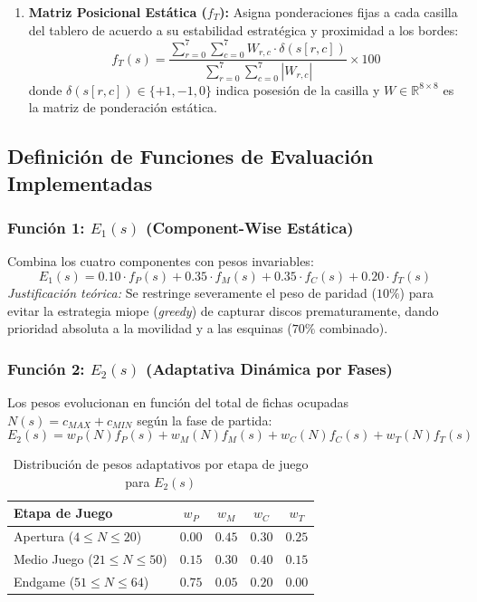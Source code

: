 \documentclass[10pt,a4paper]{article}
\begin{document}
\begin{enumerate}
    \item \textbf{Matriz Posicional Estática ($f_T$):} Asigna ponderaciones fijas a cada casilla del tablero de acuerdo a su estabilidad estratégica y proximidad a los bordes:
    \begin{equation}
        f_T(s) = \frac{\sum_{r=0}^{7} \sum_{c=0}^{7} W_{r,c} \cdot \delta(s[r,c])}{\sum_{r=0}^{7} \sum_{c=0}^{7} |W_{r,c}|} \times 100
    \end{equation}
    donde $\delta(s[r,c]) \in \{+1, -1, 0\}$ indica posesión de la casilla y $W \in \mathbb{R}^{8 \times 8}$ es la matriz de ponderación estática.
\end{enumerate}

\subsection{Definición de Funciones de Evaluación Implementadas}

\subsubsection{Función 1: \texorpdfstring{$E_1(s)$}{E1(s)} (Component-Wise Estática)}
Combina los cuatro componentes con pesos invariables:
\begin{equation}
    E_1(s) = 0.10 \cdot f_P(s) + 0.35 \cdot f_M(s) + 0.35 \cdot f_C(s) + 0.20 \cdot f_T(s)
\end{equation}
\textit{Justificación teórica:} Se restringe severamente el peso de paridad ($10\%$) para evitar la estrategia miope (\textit{greedy}) de capturar discos prematuramente, dando prioridad absoluta a la movilidad y a las esquinas ($70\%$ combinado).

\subsubsection{Función 2: \texorpdfstring{$E_2(s)$}{E2(s)} (Adaptativa Dinámica por Fases)}
Los pesos evolucionan en función del total de fichas ocupadas $N(s) = c_{MAX} + c_{MIN}$ según la fase de partida:
\begin{equation}
    E_2(s) = w_P(N) f_P(s) + w_M(N) f_M(s) + w_C(N) f_C(s) + w_T(N) f_T(s)
\end{equation}

\begin{table}[h]
    \centering
    \caption{Distribución de pesos adaptativos por etapa de juego para $E_2(s)$}
    \label{tab:pesos_e2}
    \begin{tabular}{lcccc}
        \toprule
        \textbf{Etapa de Juego} & $w_P$ & $w_M$ & $w_C$ & $w_T$ \\
        \midrule
        Apertura ($4 \le N \le 20$) & $0.00$ & $0.45$ & $0.30$ & $0.25$ \\
        Medio Juego ($21 \le N \le 50$) & $0.15$ & $0.30$ & $0.40$ & $0.15$ \\
        Endgame ($51 \le N \le 64$) & $0.75$ & $0.05$ & $0.20$ & $0.00$ \\
        \bottomrule
    \end{tabular}
\end{table}
\end{document}
